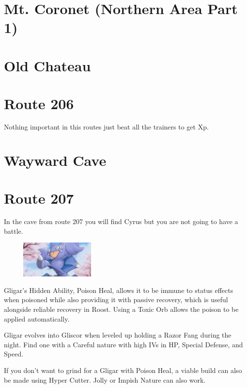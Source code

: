 \documentclass[11pt]{article}
\begin{document}


\section{Mt. Coronet (Northern Area Part 1)}
\label{sec:Mt._Coronet}


\section{Old Chateau}
\label{sec:Old_Chateau}


\section{Route 206}\label{sec:Route_206}

Nothing important in this routes just beat all the trainers to get Xp.



\section{Wayward Cave}
\label{sec:Wayward_Cave}


\section{Route 207}\label{sec:Route_207}

In the cave from route 207 you will find Cyrus but you are not going to have a battle.




\begin{mdframed}[style=MyFrame,nobreak=true,frametitle={Pokemon Spotlight: Gligar}]

\begin{figure}
\includegraphics[width=0.33\textwidth]{walkthrough/Sinnoh/spotlight-gligar}
\label{fig:spotlight-gligar}
\end{figure}

Gligar's Hidden Ability, Poison Heal, allows it to be immune to status effects
when poisoned while also providing it with passive recovery, which is useful
alongside reliable recovery in Roost.
Using a Toxic Orb allows the poison to be applied automatically.

Gligar evolves into Gliscor when leveled up holding a Razor Fang during the night.
Find one with a Careful nature with high IVs in HP, Special Defense, and Speed.

If you don't want to grind for a Gligar with Poison Heal, a viable build can
also be made using Hyper Cutter.
Jolly or Impish Nature can also work.

\end{mdframed}
\end{document}
